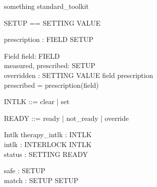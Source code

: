 \documentclass{llncs}
\begin{document}
\begin{zsection}
\SECTION something \parents standard\_toolkit
\end{zsection}

\begin{zed}
\end{zed}
\begin{zed}
SETUP == SETTING \fun VALUE
\end{zed}
\begin{axdef}
prescription : FIELD \pfun SETUP
\end{axdef}


\begin{schema}{Field}
field: FIELD \\
measured, prescribed: SETUP \\
overridden : SETTING \pfun VALUE
\where field \in \dom prescription \\
prescribed = prescription(field)
\end{schema}

\begin{zed}
[INTERLOCK]
\end{zed}
\begin{zed}
INTLK ::= clear | set
\end{zed}
\begin{zed}
READY ::= ready | not\_ready | override
\end{zed}

\begin{schema}{Intlk}
therapy\_intlk : INTLK \\
intlk : INTERLOCK \fun INTLK \\
status : SETTING \fun READY
\end{schema}

\begin{axdef}
safe : \power SETUP \\
match : SETUP \rel SETUP
\end{axdef}

\end{document}
